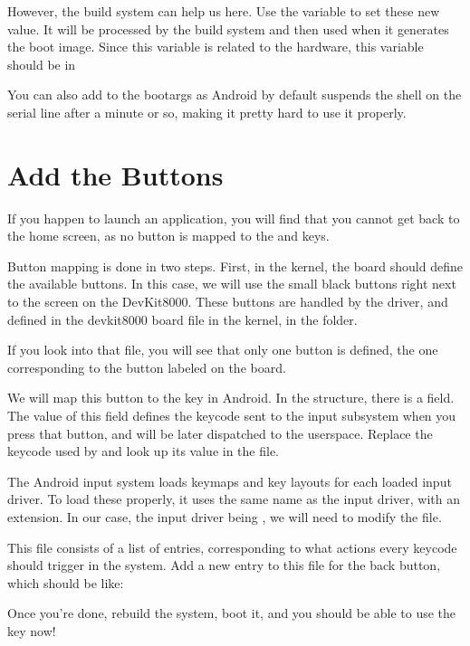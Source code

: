 However, the build system can help us here. Use the
 variable to set these new value. It will
be processed by the build system and then used when it generates the
boot image. Since this variable is related to the hardware, this
variable should be in 

You can also add  to the bootargs as Android
by default suspends the shell on the serial line after a minute or so,
making it pretty hard to use it properly.

\section{Add the Buttons}

If you happen to launch an application, you will find that you cannot
get back to the home screen, as no button is mapped to the 
and  keys.

Button mapping is done in two steps. First, in the kernel, the board
should define the available buttons. In this case, we will use the
small black buttons right next to the screen on the DevKit8000. These
buttons are handled by the  driver, and defined in the
devkit8000 board file in the kernel, in the 
folder.

If you look into that file, you will see that only one button is
defined, the one corresponding to the button labeled 
on the board.

We will map this button to the  key in Android. In the
 structure, there is a  field. The
value of this field defines the keycode sent to the input subsystem
when you press that button, and will be later dispatched to the
userspace. Replace the keycode used by  and look up its
value in the  file.

The Android input system loads keymaps and key layouts for each loaded
input driver. To load these properly, it uses the same name as the
input driver, with an extension. In our case, the input driver being
, we will need to modify the  file.

This file consists of a list of entries, corresponding to what actions
every keycode should trigger in the system. Add a new entry to this
file for the back button, which should be like:

Once you're done, rebuild the system, boot it, and you should be able
to use the  key now!
